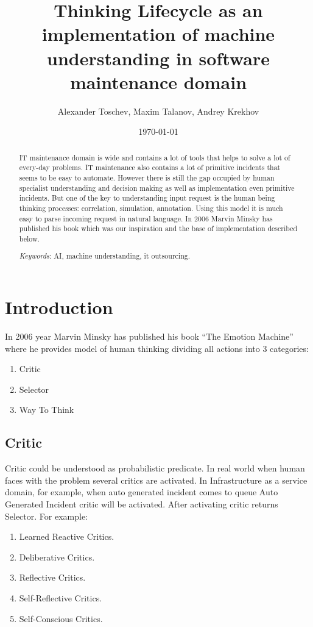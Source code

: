 \documentclass{llncs}
\title{Thinking Lifecycle as an implementation of machine understanding in software maintenance domain}
\author{Alexander Toschev\inst{1}, Maxim Talanov\inst{2}, Andrey Krekhov\inst{2}}
\institute{Kazan State University, Kazan, Russia
\and
Fujitsu GDC Russia, Kazan, Russia}
\date{\today}
\begin{document}
\maketitle

\begin{abstract}
IT maintenance domain is wide and contains a lot of tools that helps to solve a lot of every-day problems. IT maintenance also contains a lot of primitive incidents that seems to be easy to automate. However there is still the gap occupied by human specialist understanding and decision making as well as implementation even primitive incidents. But one of the key to understanding input request is the human being thinking processes: correlation, simulation, annotation. Using this model it is much easy to parse incoming request in natural language. In 2006 Marvin Minsky has published his book \cite{minsk} which was our inspiration and the base of implementation described below.

\emph{Keywords}: AI, machine understanding, it outsourcing.

\end{abstract}

\section{Introduction}
In 2006 year Marvin Minsky has published his book “The Emotion Machine” where he provides model of human thinking dividing all actions into 3 categories:

\begin{enumerate}
 \item Critic
 \item Selector
 \item Way To Think
\end{enumerate}

\subsection{Critic}
Critic could be understood as probabilistic predicate. In real world when human faces with the problem several critics are activated. In Infrastructure as a service domain, for example, when auto generated incident comes to queue Auto Generated Incident critic will be activated. After activating critic returns Selector.
For example:

\begin{enumerate}
 \item Learned Reactive Critics.
 \item Deliberative Critics.
 \item Reflective Critics.
 \item Self-Reflective Critics.
 \item Self-Conscious Critics.
\end{enumerate}
\end{document}
